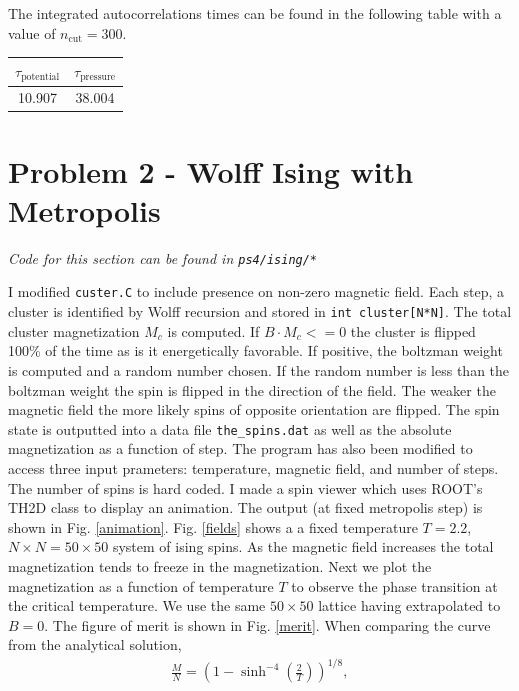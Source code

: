 \documentclass[singlepage,notitlepage,nofootinbib,11pt]{revtex4-1}
\begin{document}
The integrated autocorrelations times can be found in the following table with a value of $n_{\text{cut}} = 300$.
  \begin{center}
    \begin{tabular}{| c | c |}\hline
      $\tau_{\text{potential}}$ & $\tau_{\text{pressure}}$ \\ \hline
        10.907 & 38.004\\ \hline
    \end{tabular}
  \end{center}
\clearpage
\section{Problem 2 - Wolff Ising with Metropolis}
\begin{center} {\it Code for this section can be found in \verb|ps4/ising/*| } \end{center}
I modified \verb|custer.C| to include presence on non-zero magnetic field. Each step, a cluster is identified by Wolff recursion and stored in \verb|int cluster[N*N]|. The total cluster magnetization $M_c$ is computed. If $B\cdot M_c <= 0$ the cluster is flipped 100\% of the time as is it energetically favorable. If positive, the boltzman weight is computed and a random number chosen. If the random number is less than the boltzman weight the spin is flipped in the direction of the field. The weaker the magnetic field the more likely spins of opposite orientation are flipped. The spin state is outputted into a data file \verb|the_spins.dat| as well as the absolute magnetization as a function of step. The program has also been modified to access three input prameters: temperature, magnetic field, and number of steps. The number of spins is hard coded. I made a spin viewer which uses ROOT's TH2D class to display an animation. The output (at fixed metropolis step) is shown in Fig. \ref{animation}. Fig. \ref{fields} shows a a fixed temperature $T=2.2$, $N\times N = 50\times 50$ system of ising spins. As the magnetic field increases the total magnetization tends to freeze in the magnetization. Next we plot the magnetization as a function of temperature $T$ to observe the phase transition at the critical temperature. We use the same $50\times50$ lattice having extrapolated to $B=0$. The figure of merit is shown in Fig. \ref{merit}. When comparing the curve from the analytical solution,
\begin{align*}
  \frac{M}{N} = \left(1-\sinh^{-4}\left(\frac{2}{T}\right)\right)^{1/8},
\end{align*}
\end{document}
